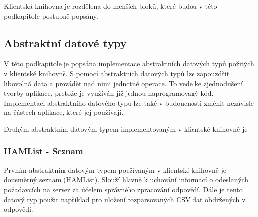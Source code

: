 Klientská knihovna je rozdělena do menších bloků, které budou v této podkapitole
postupně popsány.

\subsection{Abstraktní datové typy}

V této podkapitole je popsána implementace abstraktních datových typů požitých v klientské knihovně.
S pomocí abstraktních datových typů lze zapouzdřit libovolná data a provádět nad nimi jednotné operace.
To vede ke zjednodušení tvorby aplikace, protože je využíván již jednou naprogramovaný kód. Implementaci
abstraktního datového typu lze také v budoucnosti změnit nezávisle na částech aplikace, které jej používají.

Druhým abstraktním datovým typem implementovaným v klientské knihovně je 
\subsubsection{HAMList - Seznam}

Prvním abstraktním datovým typem používaným v klientské knihovně
je dousměrný seznam (HAMList). Slouží hlavně k uchování informací o odeslaných požadavcích na server za účelem
správného zpracování odpovědí. Dále je tento datový typ použit například pro uložení rozparsovaných CSV dat obdržených
v odpovědi.

